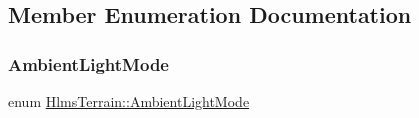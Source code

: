 \subsection{Member Enumeration Documentation}
\mbox{\label{class_hlms_terrain_a49e72052d5ccdc3b34459069c4496a49}} 
\subsubsection{\texorpdfstring{Ambient\+Light\+Mode}{AmbientLightMode}}
{\footnotesize\ttfamily enum \hyperlink{class_hlms_terrain_a49e72052d5ccdc3b34459069c4496a49}{Hlms\+Terrain\+::\+Ambient\+Light\+Mode}}

